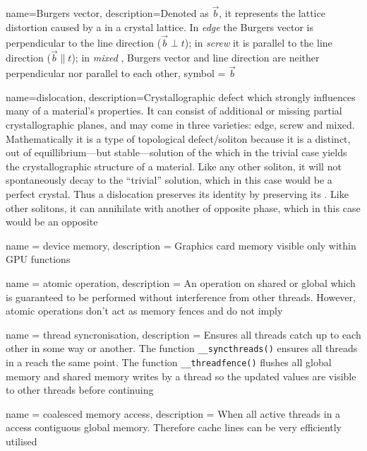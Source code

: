 {
	name={Burgers vector},
	description={Denoted as $\vec{b}$, it represents the lattice distortion caused by a  in a crystal lattice. In \emph{edge}  the Burgers vector is perpendicular to the line direction ($ \vec{b} \perp t $); in \emph{screw}  it is parallel to the line direction ($ \vec{b} \parallel t $); in \emph{mixed} , Burgers vector and line direction are neither perpendicular nor parallel to each other},
	symbol = {\ensuremath{\vec{b}}}
}

{
	name={dislocation},
	description={Crystallographic defect which strongly influences many of a material's properties. It can consist of additional or missing partial crystallographic planes, and may come in three varieties: edge, screw and mixed. Mathematically it is a type of topological defect/soliton because it is a distinct, out of equillibrium---but stable---solution of the  which in the trivial case yields the crystallographic structure of a material. Like any other soliton, it will not spontaneously decay to the ``trivial'' solution, which in this case would be a perfect crystal. Thus a dislocation preserves its identity by preserving its . Like other solitons, it can annihilate with another of opposite phase, which in this case would be an opposite }
}

{
	name = {device memory},
	description = {Graphics card memory visible only within GPU functions}
}

{
	name = {atomic operation},
	description = {An operation on shared or global  which is guaranteed to be performed without interference from other threads. However, atomic operations don't act as memory fences and do not imply  \cite{nvidia_atomics}}
}

{
	name = {thread syncronisation},
	description = {Ensures all threads catch up to each other in some way or another. The function \texttt{__syncthreads()} ensures all threads in a  reach the same point. The function \texttt{__threadfence()} flushes all global memory and shared memory writes by a thread so the updated values are visible to other threads before continuing}
}

{
	name = {coalesced memory access},
	description = {When all active threads in a  access contiguous global memory. Therefore cache lines can be very efficiently utilised}
}

